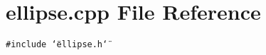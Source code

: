 \section{ellipse.cpp File Reference}
\label{ellipse_8cpp}
{\tt \#include \char`\"{}ellipse.h\char`\"{}}\par
